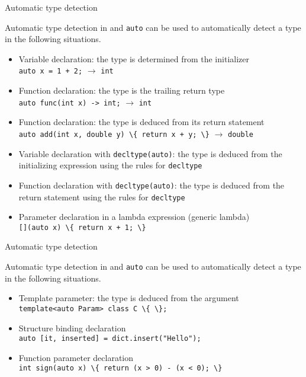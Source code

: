 \begin{frame}{Automatic type detection}{}
  \begin{block}{Automatic type detection in  and }
    \lstinline!auto! can be used to automatically detect a type in the following situations.
    \begin{itemize}
    \item
      Variable declaration: the type is determined from the initializer \\
      \lstinline!auto x = 1 + 2;! $\to$ \lstinline!int!
    \item
      Function declaration: the type is the trailing return type \\
      \lstinline!auto func(int x) -> int;! $\to$ \lstinline!int!
    \item
      Function declaration: the type is deduced from its return statement \\
      \lstinline!auto add(int x, double y) \{ return x + y; \}! $\to$ \lstinline!double!
    \item
      Variable declaration with \lstinline!decltype(auto)!: the type is deduced from the initializing expression using the rules for \lstinline!decltype!
    \item
      Function declaration with \lstinline!decltype(auto)!: the type is deduced from the return statement using the rules for \lstinline!decltype!
    \item
      Parameter declaration in a lambda expression (generic lambda) \\
      \lstinline![](auto x) \{ return x + 1; \}!
    \end{itemize}
  \end{block}
\end{frame}

\begin{frame}{Automatic type detection}{}
  \begin{block}{Automatic type detection in  and }
    \lstinline!auto! can be used to automatically detect a type in the following situations.
    \begin{itemize}
    \item
      Template parameter: the type is deduced from the argument \\
      \lstinline!template<auto Param> class C \{ \};!
    \item
      Structure binding declaration \\
      \lstinline!auto [it, inserted] = dict.insert("Hello");!
    \item
      Function parameter declaration \\
      \lstinline!int sign(auto x) \{ return (x > 0) - (x < 0); \}!
    \end{itemize}
  \end{block}
\end{frame}

